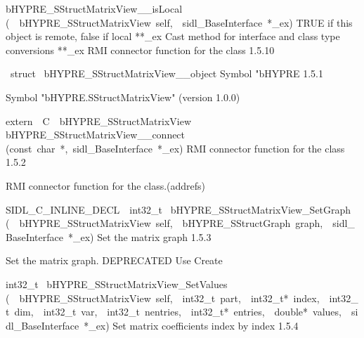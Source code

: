 \documentclass{article}
\begin{document}
\begin{cxxentry}
\begin{cxxentry}
\begin{cxxnames}
        {}
\label{cxx.1.5.18}
        {bHYPRE\_SStructMatrixView\_\_isLocal}
        {(\ \ bHYPRE\_SStructMatrixView\ self,\ \ sidl\_BaseInterface\ *\_ex)}
        {
TRUE if this object is remote, false if local}
        {}
\label{cxx.1.5.19}
        {**\_ex}
        {}
        {
Cast method for interface and class type conversions}
        {}
\label{cxx.1.5.20}
        {**\_ex}
        {}
        {
RMI connector function for the class}
        {1.5.10}
\end{cxxnames}
\begin{cxxvariable}
{\ struct\ }
        {bHYPRE\_SStructMatrixView\_\_object}
        {}
        {
Symbol "bHYPRE}
        {1.5.1}
\begin{cxxdoc}

Symbol "bHYPRE.SStructMatrixView" (version 1.0.0)
\end{cxxdoc}
\end{cxxvariable}
\begin{cxxfunction}
{extern\ \ C\ \ bHYPRE\_SStructMatrixView\ }
        {bHYPRE\_SStructMatrixView\_\_connect}
        {(const\ char\ *,\ sidl\_BaseInterface\ *\_ex)}
        {
RMI connector function for the class}
        {1.5.2}
\begin{cxxdoc}

RMI connector function for the class.(addrefs)
\end{cxxdoc}
\end{cxxfunction}
\begin{cxxfunction}
{SIDL\_C\_INLINE\_DECL\ \ int32\_t\ }
        {bHYPRE\_SStructMatrixView\_SetGraph}
        {(\ \ bHYPRE\_SStructMatrixView\ self,\ \ bHYPRE\_SStructGraph\ graph,\ \ sidl\_BaseInterface\ *\_ex)}
        {
Set the matrix graph}
        {1.5.3}
\begin{cxxdoc}

Set the matrix graph.
DEPRECATED     Use Create
\end{cxxdoc}
\end{cxxfunction}
\begin{cxxfunction}
{int32\_t\ }
        {bHYPRE\_SStructMatrixView\_SetValues}
        {(\ \ bHYPRE\_SStructMatrixView\ self,\ \ int32\_t\ part,\ \ int32\_t*\ index,\ \ int32\_t\ dim,\ \ int32\_t\ var,\ \ int32\_t\ nentries,\ \ int32\_t*\ entries,\ \ double*\ values,\ \ sidl\_BaseInterface\ *\_ex)}
        {
Set matrix coefficients index by index}
        {1.5.4}
\begin{cxxdoc}


\end{cxxdoc}
\end{cxxfunction}
\end{cxxentry}
\end{cxxentry}
\end{document}
